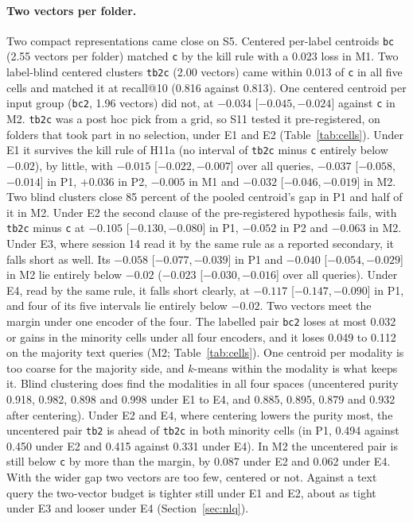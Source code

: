 \documentclass[11pt]{article}
\newcommand{\rep}[1]{\texttt{#1}}
\newcommand{\ci}[2]{[\ensuremath{#1},\,\ensuremath{#2}]}  %
\begin{document}
\paragraph{Two vectors per folder.} Two compact representations came close on S5. Centered per-label centroids \rep{bc} (2.55 vectors per folder) matched \rep{c} by the kill rule with a 0.023 loss in M1. Two label-blind centered clusters \rep{tb2c} (2.00 vectors) came within 0.013 of \rep{c} in all five cells and matched it at recall@10 (0.816 against 0.813). One centered centroid per input group (\rep{bc2}, 1.96 vectors) did not, at $-0.034$ \ci{-0.045}{-0.024} against \rep{c} in M2. \rep{tb2c} was a post hoc pick from a grid, so S11 tested it pre-registered, on folders that took part in no selection, under E1 and E2 (Table~\ref{tab:cells}). Under E1 it survives the kill rule of H11a (no interval of \rep{tb2c} minus \rep{c} entirely below $-0.02$), by little, with $-0.015$ \ci{-0.022}{-0.007} over all queries, $-0.037$ \ci{-0.058}{-0.014} in P1, $+0.036$ in P2, $-0.005$ in M1 and $-0.032$ \ci{-0.046}{-0.019} in M2. Two blind clusters close 85 percent of the pooled centroid's gap in P1 and half of it in M2. Under E2 the second clause of the pre-registered hypothesis fails, with \rep{tb2c} minus \rep{c} at $-0.105$ \ci{-0.130}{-0.080} in P1, $-0.052$ in P2 and $-0.063$ in M2. Under E3, where session 14 read it by the same rule as a reported secondary, it falls short as well. Its $-0.058$ \ci{-0.077}{-0.039} in P1 and $-0.040$ \ci{-0.054}{-0.029} in M2 lie entirely below $-0.02$ ($-0.023$ \ci{-0.030}{-0.016} over all queries). Under E4, read by the same rule, it falls short clearly, at $-0.117$ \ci{-0.147}{-0.090} in P1, and four of its five intervals lie entirely below $-0.02$. Two vectors meet the margin under one encoder of the four. The labelled pair \rep{bc2} loses at most 0.032 or gains in the minority cells under all four encoders, and it loses 0.049 to 0.112 on the majority text queries (M2; Table~\ref{tab:cells}). One centroid per modality is too coarse for the majority side, and $k$-means within the modality is what keeps it. Blind clustering does find the modalities in all four spaces (uncentered purity 0.918, 0.982, 0.898 and 0.998 under E1 to E4, and 0.885, 0.895, 0.879 and 0.932 after centering). Under E2 and E4, where centering lowers the purity most, the uncentered pair \rep{tb2} is ahead of \rep{tb2c} in both minority cells (in P1, 0.494 against 0.450 under E2 and 0.415 against 0.331 under E4). In M2 the uncentered pair is still below \rep{c} by more than the margin, by 0.087 under E2 and 0.062 under E4. With the wider gap two vectors are too few, centered or not. Against a text query the two-vector budget is tighter still under E1 and E2, about as tight under E3 and looser under E4 (Section~\ref{sec:nlq}).
\end{document}
